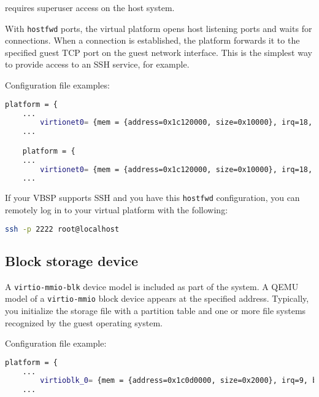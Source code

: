  requires superuser access on the host system.

With {\small{\lstinline!hostfwd!}} ports, the virtual platform opens host listening ports and waits for connections. When a connection is established, the platform forwards it to the specified guest TCP port on the guest network interface. This is the simplest way to provide access to an SSH service, for example.

Configuration file examples:

\small
\begin{lstlisting}[language=bash]
    platform = {
    ...
        virtionet0= {mem = {address=0x1c120000, size=0x10000}, irq=18, netdev_str="type=user,hostfwd=tcp::2222-:22,hostfwd=tcp::2221-:21"};
    ...

    platform = {
    ...
        virtionet0= {mem = {address=0x1c120000, size=0x10000}, irq=18, netdev_str="type=tap"};
    ...
\end{lstlisting}
\normalsize

\clearpage

If your VBSP supports SSH and you have this {\small{\lstinline!hostfwd!}} configuration, you can remotely log in to your virtual platform with the following:

\small
\begin{lstlisting}[language=bash]
    ssh -p 2222 root@localhost
\end{lstlisting}
\normalsize


\subsection{Block storage device}

A {\small{\lstinline!virtio-mmio-blk!}} device model is included as part of the system. A QEMU model of a {\small{\lstinline!virtio-mmio!}} block device appears at the specified address. Typically, you initialize the storage file with a partition table and one or more file systems recognized by the guest operating system.

Configuration file example:

\small
\begin{lstlisting}[language=bash]
    platform = {
    ...
        virtioblk_0= {mem = {address=0x1c0d0000, size=0x2000}, irq=9, blkdev_str="file="..top().."system_qdrive.img,format=raw,if=none"};
    ...
\end{lstlisting}
\normalsize


